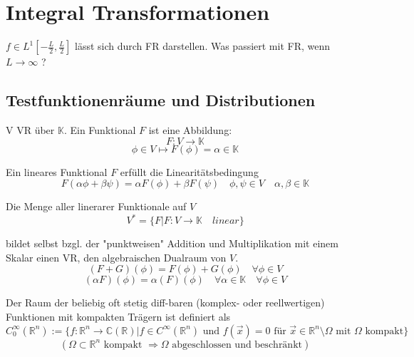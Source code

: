 \section{Integral Transformationen}
    $f \in L^1[-\frac{L}{2}, \frac{L}{2}]$ lässt sich durch
    FR darstellen. Was passiert mit FR, wenn 
    $L \rightarrow \infty$ ?


    \subsection{Testfunktionenräume und Distributionen}

    \begin{Def}
        V VR über $\mathbb{K}$. Ein Funktional $F$ ist eine Abbildung:
        $$F: V \rightarrow \mathbb{K}$$
        $$ \phi \in V \mapsto F(\phi) = \alpha \in \mathbb{K}$$

        Ein lineares Funktional $F$ erfüllt die Linearitätsbedingung
        $$F(\alpha \phi + \beta \psi) = \alpha F(\phi) + \beta F(\psi) \quad \phi , \psi \in V \quad \alpha, \beta \in \mathbb{K} $$

        Die Menge aller linerarer Funktionale auf $V$
        $$V^\ast =  \{ F | F:V \rightarrow \mathbb{K} \quad linear \} $$

        bildet selbst bzgl. der "punktweisen" Addition und Multiplikation
        mit einem Skalar einen VR, den algebraischen Dualraum von $V$.
        $$(F+G)(\phi) = F(\phi) + G(\phi) \quad \forall \phi \in V $$
        $$(\alpha F)(\phi) = \alpha (F)(\phi)  \quad \forall \alpha \in \mathbb{K} \quad \forall \phi \in V $$
    \end{Def}

    \begin{Def}
        Der Raum der beliebig oft stetig diff-baren (komplex- oder 
        reellwertigen) Funktionen mit kompakten Trägern ist definiert als
        $$C_0^\infty (\mathbb{R}^n)  := \{ f:\mathbb{R}^n \rightarrow \mathbb{C}(\mathbb{R}) | f \in C^\infty(\mathbb{R}^n) \textrm{ und } f(\vec{x})=0 \textrm{ für } \vec{x} \in \mathbb{R}^n \setminus  \Omega \textrm{ mit } \Omega \textrm{ kompakt} \}$$
        $$( \Omega \subset \mathbb{R}^n \textrm{ kompakt } \Rightarrow \Omega \textrm{ abgeschlossen und beschränkt} )$$
    \end{Def}